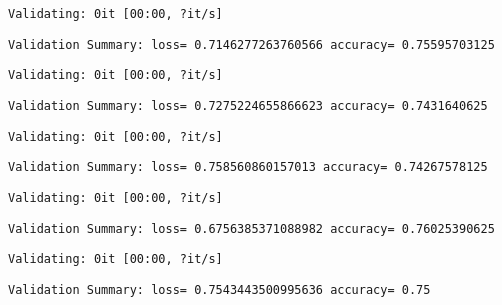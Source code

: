 \documentclass[11pt]{article}
\begin{document}
    
    \begin{Verbatim}[commandchars=\\\{\}]
Validating: 0it [00:00, ?it/s]
    \end{Verbatim}

    
    \begin{Verbatim}[commandchars=\\\{\}]
Validation Summary: loss= 0.7146277263760566 accuracy= 0.75595703125
    \end{Verbatim}

    
    \begin{Verbatim}[commandchars=\\\{\}]
Validating: 0it [00:00, ?it/s]
    \end{Verbatim}

    
    \begin{Verbatim}[commandchars=\\\{\}]
Validation Summary: loss= 0.7275224655866623 accuracy= 0.7431640625
    \end{Verbatim}

    
    \begin{Verbatim}[commandchars=\\\{\}]
Validating: 0it [00:00, ?it/s]
    \end{Verbatim}

    
    \begin{Verbatim}[commandchars=\\\{\}]
Validation Summary: loss= 0.758560860157013 accuracy= 0.74267578125
    \end{Verbatim}

    
    \begin{Verbatim}[commandchars=\\\{\}]
Validating: 0it [00:00, ?it/s]
    \end{Verbatim}

    
    \begin{Verbatim}[commandchars=\\\{\}]
Validation Summary: loss= 0.6756385371088982 accuracy= 0.76025390625
    \end{Verbatim}

    
    \begin{Verbatim}[commandchars=\\\{\}]
Validating: 0it [00:00, ?it/s]
    \end{Verbatim}

    
    \begin{Verbatim}[commandchars=\\\{\}]
Validation Summary: loss= 0.7543443500995636 accuracy= 0.75
    \end{Verbatim}
\end{document}
